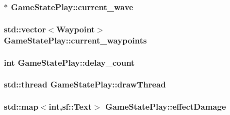 \hypertarget{class_game_state_play_a64cd6841a6f7139ff7e3747e4159654c}{
\subsubsection[{current\+\_\+wave}]{$\ast$ Game\+State\+Play\+::current\+\_\+wave\hspace{0.3cm}{\ttfamily [private]}}}\label{class_game_state_play_a64cd6841a6f7139ff7e3747e4159654c}
\hypertarget{class_game_state_play_a14914e609fd8b83324b3fc47343ec19a}{
\subsubsection[{current\+\_\+waypoints}]{\setlength{\rightskip}{0pt plus 5cm}std\+::vector$<${\bf Waypoint}$>$ Game\+State\+Play\+::current\+\_\+waypoints\hspace{0.3cm}{\ttfamily [private]}}}\label{class_game_state_play_a14914e609fd8b83324b3fc47343ec19a}
\hypertarget{class_game_state_play_aa0948c192d3ef1adb6eaaeade8521733}{
\subsubsection[{delay\+\_\+count}]{\setlength{\rightskip}{0pt plus 5cm}int Game\+State\+Play\+::delay\+\_\+count}}\label{class_game_state_play_aa0948c192d3ef1adb6eaaeade8521733}
\hypertarget{class_game_state_play_aac5b1d9de4ab0ad2445d97a588cb3168}{
\subsubsection[{draw\+Thread}]{\setlength{\rightskip}{0pt plus 5cm}std\+::thread Game\+State\+Play\+::draw\+Thread}}\label{class_game_state_play_aac5b1d9de4ab0ad2445d97a588cb3168}
\hypertarget{class_game_state_play_a2c0118859e607a1ef2aa008f1b94b7f8}{
\subsubsection[{effect\+Damage}]{\setlength{\rightskip}{0pt plus 5cm}std\+::map$<$int,sf\+::\+Text$>$ Game\+State\+Play\+::effect\+Damage\hspace{0.3cm}{\ttfamily [private]}}}\label{class_game_state_play_a2c0118859e607a1ef2aa008f1b94b7f8}
